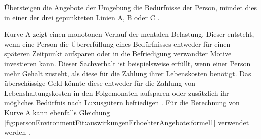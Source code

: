 Übersteigen die Angebote der Umgebung die Bedürfnisse der Person, mündet dies in einer der drei gepunkteten Linien A, B oder C \cite[S. 29ff.]{mechanismsOfJobStressAndStrain:1982}.

Kurve A zeigt einen monotonen Verlauf der mentalen Belastung. Dieser entsteht, wenn eine Person die Übererfüllung eines Bedürfnisses entweder für einen späteren Zeitpunkt aufsparen oder in die Befriedigung verwandter Motive investieren kann. Dieser Sachverhalt ist beispielsweise erfüllt, wenn einer Person mehr Gehalt zusteht, als diese für die Zahlung ihrer Lebenskosten benötigt. Das überschüssige Geld könnte diese entweder für die Zahlung von Lebenshaltungskosten in den Folgemonaten aufsparen oder zusätzlich ihr mögliches Bedürfnis nach Luxusgütern befriedigen \cite[S. 30]{mechanismsOfJobStressAndStrain:1982}. Für die Berechnung von Kurve A kann ebenfalls Gleichung \ref{fig:personEnvironmentFit:auswirkungenErhoehterAngebote:formel1} verwendet werden \cite[S. 2]{edwards:1993}.


